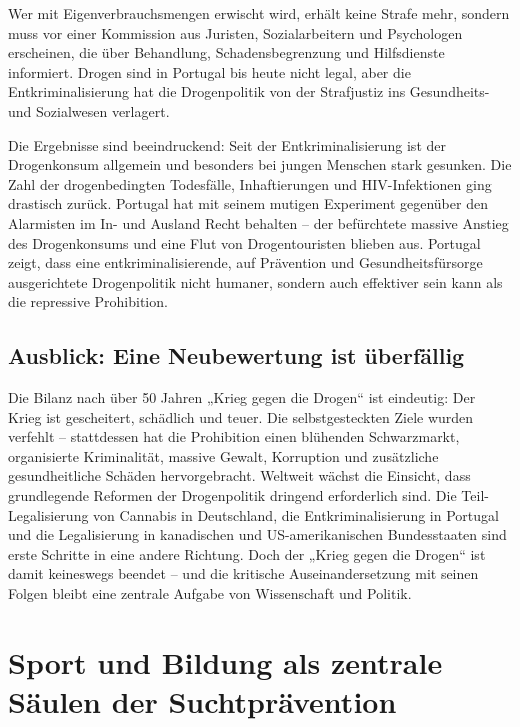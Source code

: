\documentclass[11pt,a4paper]{article}
\begin{document}
	Wer mit Eigenverbrauchsmengen erwischt wird, erhält keine Strafe mehr, sondern muss vor einer Kommission aus Juristen, Sozialarbeitern und Psychologen erscheinen, die über Behandlung, Schadensbegrenzung und Hilfsdienste informiert.\cite{portugal-model} Drogen sind in Portugal bis heute nicht legal, aber die Entkriminalisierung hat die Drogenpolitik von der Strafjustiz ins Gesundheits- und Sozialwesen verlagert.
	
	Die Ergebnisse sind beeindruckend: Seit der Entkriminalisierung ist der Drogenkonsum allgemein und besonders bei jungen Menschen stark gesunken. Die Zahl der drogenbedingten Todesfälle, Inhaftierungen und HIV-Infektionen ging drastisch zurück.\cite{portugal-results} Portugal hat mit seinem mutigen Experiment gegenüber den Alarmisten im In- und Ausland Recht behalten – der befürchtete massive Anstieg des Drogenkonsums und eine Flut von Drogentouristen blieben aus.\cite{portugal-results} Portugal zeigt, dass eine entkriminalisierende, auf Prävention und Gesundheitsfürsorge ausgerichtete Drogenpolitik nicht humaner, sondern auch effektiver sein kann als die repressive Prohibition.
	
	\subsection{Ausblick: Eine Neubewertung ist überfällig}
	
	Die Bilanz nach über 50 Jahren „Krieg gegen die Drogen“ ist eindeutig: Der Krieg ist gescheitert, schädlich und teuer.\cite{uni-muenster-prohibition} Die selbstgesteckten Ziele wurden verfehlt – stattdessen hat die Prohibition einen blühenden Schwarzmarkt, organisierte Kriminalität, massive Gewalt, Korruption und zusätzliche gesundheitliche Schäden hervorgebracht. Weltweit wächst die Einsicht, dass grundlegende Reformen der Drogenpolitik dringend erforderlich sind.\cite{nobis-failure} Die Teil-Legalisierung von Cannabis in Deutschland, die Entkriminalisierung in Portugal und die Legalisierung in kanadischen und US-amerikanischen Bundesstaaten sind erste Schritte in eine andere Richtung. Doch der „Krieg gegen die Drogen“ ist damit keineswegs beendet – und die kritische Auseinandersetzung mit seinen Folgen bleibt eine zentrale Aufgabe von Wissenschaft und Politik.
	
	\section{Sport und Bildung als zentrale Säulen der Suchtprävention}
	
\end{document}
